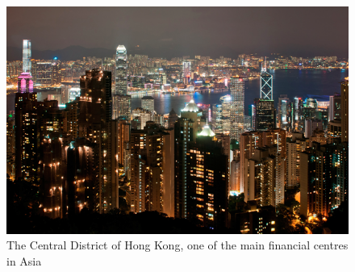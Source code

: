 \documentclass[international_finance_p1.tex]{subfiles}
\begin{document}
\begin{frame}
\begin{figure}
\centering
\includegraphics[scale=0.35]{img/Hong_Kong}
\caption{The Central District of Hong Kong, one of the main financial centres in Asia}
\end{figure}
\end{frame}
\end{document}

